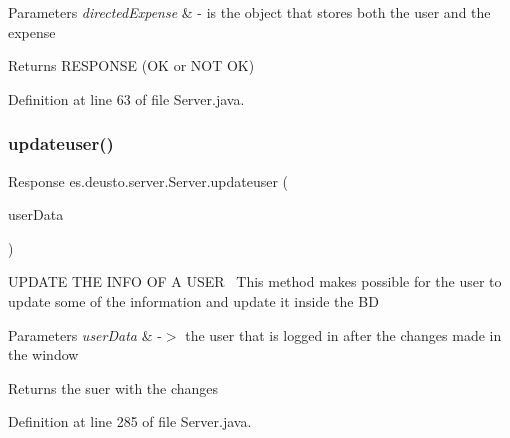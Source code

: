 \begin{DoxyParams}{Parameters}
{\em directed\+Expense} & -\/ is the object that stores both the user and the expense \\
\hline
\end{DoxyParams}
\begin{DoxyReturn}{Returns}
R\+E\+S\+P\+O\+N\+SE (OK or N\+OT OK) 
\end{DoxyReturn}


Definition at line 63 of file Server.\+java.

\mbox{\label{classes_1_1deusto_1_1server_1_1_server_aae24e983f2b93173ee25d366a522a936}} 
\subsubsection{\texorpdfstring{updateuser()}{updateuser()}}
{\footnotesize\ttfamily Response es.\+deusto.\+server.\+Server.\+updateuser (\begin{DoxyParamCaption}\item[{\hyperlink{classes_1_1deusto_1_1serialization_1_1_user_data}{User\+Data}}]{user\+Data }\end{DoxyParamCaption})}

U\+P\+D\+A\+TE T\+HE I\+N\+FO OF A U\+S\+ER~\newline
This method makes possible for the user to update some of the information and update it inside the BD


\begin{DoxyParams}{Parameters}
{\em user\+Data} & -\/$>$ the user that is logged in after the changes made in the window \\
\hline
\end{DoxyParams}
\begin{DoxyReturn}{Returns}
the suer with the changes 
\end{DoxyReturn}


Definition at line 285 of file Server.\+java.

\mbox{\label{classes_1_1deusto_1_1server_1_1_server_a6e5f5013058ddaf970b0b21da2e32f66}} 
